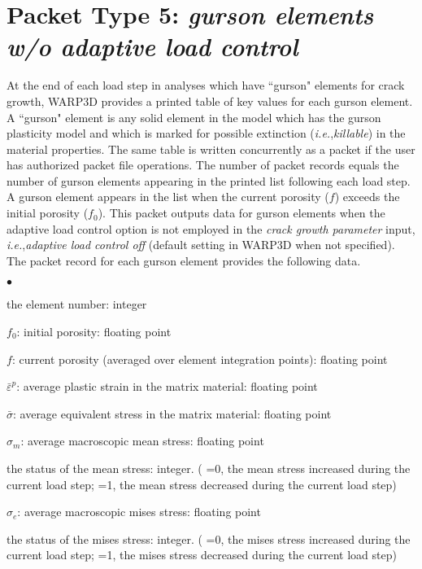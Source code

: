 \documentclass[10pt]{report}
\numberwithin{equation}{section}
\newcommand{\ie}{\ti{i.e.},\xspace}
\newcommand{\ti}{\emph}
\newcommand{\squishlist}{
 \begin{list}{$\bullet$}
  { \setlength{\itemsep}{0pt}
     \setlength{\parsep}{3pt}
     \setlength{\topsep}{3pt}
     \setlength{\partopsep}{0pt}
     \setlength{\leftmargin}{1.5em}
     \setlength{\labelwidth}{1em}
     \setlength{\labelsep}{0.5em} } }
\newcommand{\squishend}{
  \end{list}  }
\begin{document}
%
%
\section{Packet Type 5: \ti{gurson elements w/o adaptive load control}}
At the end of each load step in analyses which have ``gurson" elements for 
crack growth, WARP3D provides a printed table of key values for each 
gurson element. A ``gurson" element is any solid
element in the model which has the gurson plasticity model and
which is marked for possible extinction (\ie \ti{killable}) in the 
material properties. The same table is written concurrently as a packet if the 
user has authorized packet file operations. The number of packet records 
equals the number of gurson elements appearing in the printed list following 
each load step. A gurson element appears in the list when the current 
porosity ($f$) exceeds the initial porosity ($f_0$). This packet outputs data for 
gurson elements when the adaptive load control option is not employed 
in the \ti{crack growth parameter }input, \ie \ti{adaptive 
load control off }(default setting in WARP3D when not specified). 
The packet record for each gurson element provides the following data.
\squishlist
\item the element number:  integer
\item $f_0$:  initial porosity:  floating point
\item $f$:  current porosity (averaged over element integration points):  floating point
\item $\bar \varepsilon^p$:  average plastic strain in the matrix material:  floating point
\item $\bar \sigma$:  average equivalent stress in the matrix material:  floating point
\item $\sigma_{m}$:  average macroscopic mean stress:  floating point
\item the status of the mean stress: integer. ( =0, the mean 
stress increased during the current load step;
=1, the mean stress decreased during the current load step)
\item $\sigma_{e}$:  average macroscopic mises stress:  floating point
\item the status of the mises stress:  integer.
( =0, the mises stress increased during the current load step; 
=1, the mises stress decreased during the current load step)
\squishend
%
%
%
\end{document}
